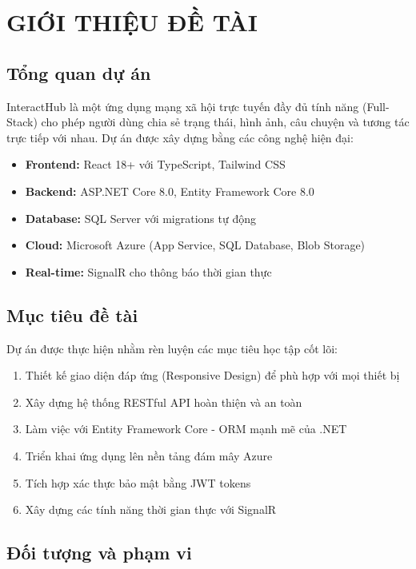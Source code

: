 \chapter{GIỚI THIỆU ĐỀ TÀI}

\section{Tổng quan dự án}
InteractHub là một ứng dụng mạng xã hội trực tuyến đầy đủ tính năng (Full-Stack) cho phép người dùng chia sẻ trạng thái, hình ảnh, câu chuyện và tương tác trực tiếp với nhau. Dự án được xây dựng bằng các công nghệ hiện đại:

\begin{itemize}
    \item \textbf{Frontend:} React 18+ với TypeScript, Tailwind CSS
    \item \textbf{Backend:} ASP.NET Core 8.0, Entity Framework Core 8.0
    \item \textbf{Database:} SQL Server với migrations tự động
    \item \textbf{Cloud:} Microsoft Azure (App Service, SQL Database, Blob Storage)
    \item \textbf{Real-time:} SignalR cho thông báo thời gian thực
\end{itemize}

\section{Mục tiêu đề tài}
Dự án được thực hiện nhằm rèn luyện các mục tiêu học tập cốt lõi:

\begin{enumerate}
    \item Thiết kế giao diện đáp ứng (Responsive Design) để phù hợp với mọi thiết bị
    \item Xây dựng hệ thống RESTful API hoàn thiện và an toàn
    \item Làm việc với Entity Framework Core - ORM mạnh mẽ của .NET
    \item Triển khai ứng dụng lên nền tảng đám mây Azure
    \item Tích hợp xác thực bảo mật bằng JWT tokens
    \item Xây dựng các tính năng thời gian thực với SignalR
\end{enumerate}

\section{Đối tượng và phạm vi}
